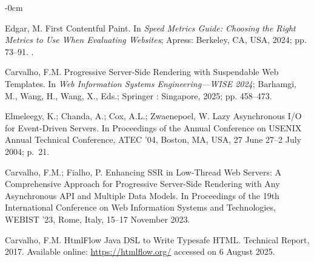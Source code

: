 \documentclass[software,article,accept,pdftex,moreauthors]{Definitions/mdpi}
\begin{document}
\begin{adjustwidth}{-\extralength}{0cm}



\begin{thebibliography}{999}

Edgar, M. First Contentful Paint.
\newblock In {\em Speed Metrics Guide: Choosing the Right Metrics to Use When
  Evaluating Websites}; Apress: Berkeley, CA, USA, 2024; pp. 73--91.
.

Carvalho, F.M.
\newblock Progressive Server-Side Rendering with Suspendable Web Templates.
\newblock In \emph{Web Information Systems Engineering---WISE
  2024}; Barhamgi, M., Wang, H., Wang, X., Eds.; Springer
: Singapore,  2025; pp. 458--473.

Elmeleegy, K.; Chanda, A.; Cox, A.L.; Zwaenepoel, W.
\newblock Lazy Asynchronous I/O for Event-Driven Servers.
\newblock In Proceedings of the Annual Conference on USENIX
  Annual Technical Conference, ATEC '04, Boston, MA, USA, 27 June 27--2 July 2004; p.~21.

Carvalho, F.M.; Fialho, P.
\newblock Enhancing SSR in Low-Thread Web Servers: A Comprehensive Approach for
  Progressive Server-Side Rendering with Any Asynchronous API and Multiple Data
  Models.
\newblock In Proceedings of the 19th International
  Conference on Web Information Systems and Technologies, WEBIST '23, Rome, Italy, 15--17 November  2023.


Carvalho, F.M.
\newblock HtmlFlow Java DSL to Write Typesafe HTML.
\newblock Technical Report, 2017. Available online: \url{https://htmlflow.org/} accessed on 6 August 2025.



\end{thebibliography}
\end{adjustwidth}
\end{document}
